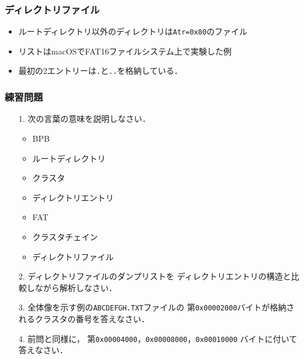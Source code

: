 \documentclass{beamer}                   %
\begin{document}
\begin{frame}
  \frametitle{ディレクトリファイル}
  \begin{itemize}
  \item ルートディレクトリ以外のディレクトリは\texttt{Atr=0x80}のファイル
  \item リストはmacOSでFAT16ファイルシステム上で実験した例
  \item 最初の2エントリーは\texttt{.}と\texttt{..}を格納している．
  \end{itemize}
  \vfill
\end{frame}

\begin{frame}
  \frametitle{練習問題}
  \begin{enumerate}
  \item[1.] 次の言葉の意味を説明しなさい．
    \begin{itemize}
    \item BPB
    \item ルートディレクトリ
    \item クラスタ
    \item ディレクトリエントリ
    \item FAT
    \item クラスタチェイン
    \item ディレクトリファイル
    \end{itemize}

  \item[2.] ディレクトリファイルのダンプリストを
    ディレクトリエントリの構造と比較しながら解析しなさい．

  \item[3.] 全体像を示す例の\texttt{ABCDEFGH.TXT}ファイルの
    第\texttt{0x00002000}バイトが格納されるクラスタの番号を答えなさい．

  \item[4.] 前問と同様に，
    第\texttt{0x00004000}，\texttt{0x00008000}，\texttt{0x00010000}
    バイトに付いて答えなさい．
  \end{enumerate}
\end{frame}

\end{document}
